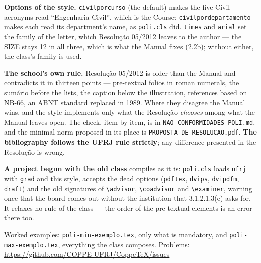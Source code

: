 \documentclass[a4paper,10pt]{article}
\begin{document}
\vspace{4pt}
\begin{center}
\begin{minipage}{0.92\textwidth}\small
\textbf{Options of the style.}
\verb|civilporcurso| (the default) makes the five Civil acronyms read
``Engenharia Civil'', which is the Course; \verb|civilpordepartamento| makes
each read its department's name, as \texttt{poli.cls} did.
\verb|times| and \verb|arial| set the family of the letter, which Resolução
05/2012 leaves to the author --- the SIZE stays 12 in all three, which is what
the Manual fixes (2.2b); without either, the class's family is used.

\medskip
\textbf{The school's own rule.} Resolução 05/2012 is older than the Manual and
contradicts it in thirteen points --- pre-textual folios in roman numerals, the
sumário before the lists, the caption below the illustration, references based
on NB-66, an ABNT standard replaced in 1989. Where they disagree the Manual
wins, and the style implements only what the Resolução \emph{chooses} among
what the Manual leaves open. The check, item by item, is in
\texttt{NAO-CONFORMIDADES-POLI.md}, and the minimal norm proposed in its place
is \texttt{PROPOSTA-DE-RESOLUCAO.pdf}. \textbf{The bibliography follows the
UFRJ rule strictly}; any difference presented in the Resolução is wrong.

\medskip
\textbf{A project begun with the old class} compiles as it is: \texttt{poli.cls}
loads \texttt{ufrj} with \texttt{grad} and this style, accepts the dead options
(\texttt{pdftex}, \texttt{dvips}, \texttt{dvipdfm}, \texttt{draft}) and the old
signatures of \verb|\advisor|, \verb|\coadvisor| and \verb|\examiner|, warning
once that the board comes out without the institution that 3.1.2.1.3(e) asks
for. It relaxes no rule of the class --- the order of the pre-textual elements
is an error there too.

\medskip
Worked examples: \texttt{poli-min-exemplo.tex}, only what is mandatory, and
\texttt{poli-max-exemplo.tex}, everything the class composes.\quad
Problems: \url{https://github.com/COPPE-UFRJ/CoppeTeX/issues}
\end{minipage}
\end{center}
\end{document}
